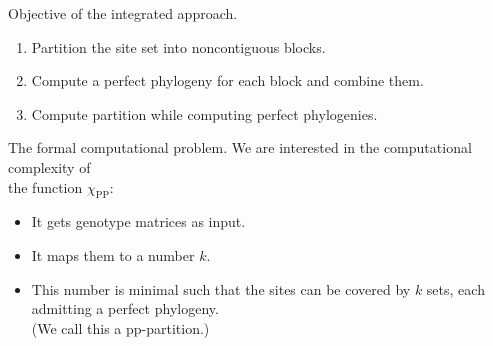 \documentclass{beamer}
\begin{document}
\begin{frame}{Objective of the integrated approach.}
  \begin{enumerate}
  \item Partition the site set into \alert{noncontiguous} blocks. 
  \item Compute a perfect phylogeny for each block and combine them. 
  \item<alert@1-> Compute partition while computing perfect
    phylogenies. 
  \end{enumerate}

\end{frame}


\begin{frame}{The formal computational problem.}
  We are interested in the computational complexity of \\
  \alert{the function \alert{$\chi_{\operatorname{PP}}$}}:
  \begin{itemize}
  \item It gets genotype matrices as input.
  \item It maps them to a number $k$.
  \item This number is minimal such that the sites can be
    covered by $k$ sets, each admitting a perfect phylogeny.
    \\
    (We call this a \alert{pp-partition}.)
  \end{itemize}
\end{frame}
\end{document}
